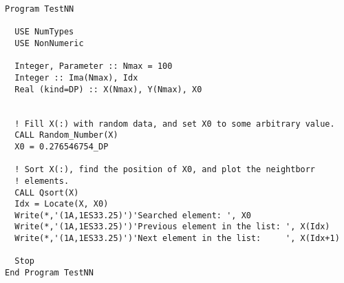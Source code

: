 \begin{lstlisting}[emph=Locate,
                   emphstyle=\color{blue},
                   frame=trBL,
                   caption=Searching data position in an ordered list.,
                   label=locate]
Program TestNN

  USE NumTypes
  USE NonNumeric

  Integer, Parameter :: Nmax = 100
  Integer :: Ima(Nmax), Idx
  Real (kind=DP) :: X(Nmax), Y(Nmax), X0


  ! Fill X(:) with random data, and set X0 to some arbitrary value. 
  CALL Random_Number(X)
  X0 = 0.276546754_DP

  ! Sort X(:), find the position of X0, and plot the neightborr
  ! elements. 
  CALL Qsort(X)
  Idx = Locate(X, X0)
  Write(*,'(1A,1ES33.25)')'Searched element: ', X0
  Write(*,'(1A,1ES33.25)')'Previous element in the list: ', X(Idx)
  Write(*,'(1A,1ES33.25)')'Next element in the list:     ', X(Idx+1)

  Stop
End Program TestNN
\end{lstlisting}

